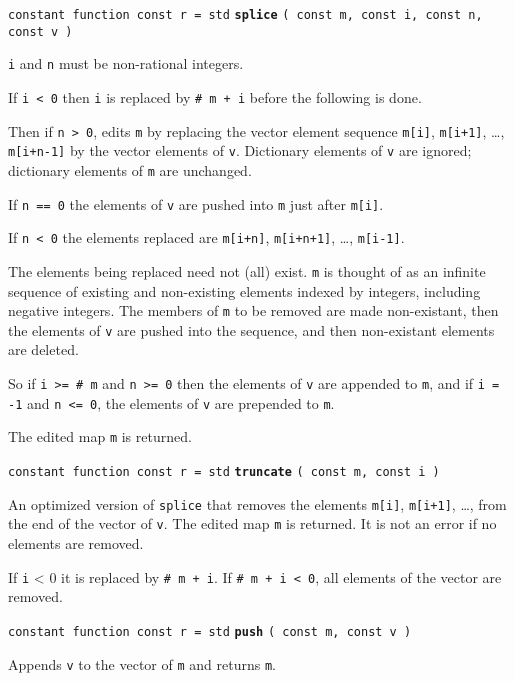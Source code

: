 \documentclass[12pt]{article}
\newcommand{\ttkey}[1]{{\tt \bfseries #1}}
\newenvironment{indpar}[1][0.3in]%
	{\begin{list}{}%
		     {\setlength{\itemsep}{0in}%
		      \setlength{\topsep}{0in}%
		      \setlength{\parsep}{1ex}%
		      \setlength{\labelwidth}{#1}%
		      \setlength{\leftmargin}{#1}%
		      \addtolength{\leftmargin}{\labelsep}}%
	 \item}%
	{\end{list}}
\begin{document}
{\tt constant function const r = std} \ttkey{splice}
    {\tt ( const m, const i, const n, const v )}
\begin{indpar}
{\tt i} and {\tt n} must be non-rational integers.

If {\tt i < 0} then {\tt i} is replaced by {\tt \# m + i} before the
following is done.

Then if {\tt n > 0},
edits {\tt m} by replacing the vector element sequence
{\tt m[i]}, {\tt m[i+1]}, \ldots, {\tt m[i+n-1]} by the
vector elements of {\tt v}.  Dictionary elements of {\tt v} are ignored;
dictionary elements of {\tt m} are unchanged.

If {\tt n == 0}
the elements of {\tt v} are pushed into {\tt m}
just after {\tt m[i]}.

If {\tt n < 0} the elements replaced are 
{\tt m[i+n]}, {\tt m[i+n+1]}, \ldots, {\tt m[i-1]}.

The elements being replaced need not (all) exist.  {\tt m} is thought
of as an infinite sequence of existing and non-existing elements indexed
by integers, including negative integers.  The members of
{\tt m} to be removed are made non-existant,
then the elements of {\tt v} are pushed
into the sequence, and then non-existant elements are deleted.

So if {\tt i >= \# m} and {\tt n >= 0} then the elements of {\tt v}
are appended to {\tt m}, and if {\tt i = -1} and {\tt n <= 0}, the
elements of {\tt v} are prepended to {\tt m}.

The edited map {\tt m} is returned.

\end{indpar}

{\tt constant function const r = std} \ttkey{truncate}
                                      {\tt ( const m, const i )}
\begin{indpar}
An optimized version of {\tt splice} that removes the elements
{\tt m[i]}, {\tt m[i+1]}, \ldots, from the end of the vector of {\tt v}.
The edited map {\tt m} is returned.  It is not an error if no elements
are removed.

If {\tt i} < 0 it is replaced by {\tt \# m + i}.  If {\tt \# m + i < 0},
all elements of the vector are removed.
\end{indpar}

{\tt constant function const r = std} \ttkey{push} {\tt ( const m, const v )}
\begin{indpar}
Appends {\tt v} to the vector of {\tt m} and returns {\tt m}.
\end{indpar}
\end{document}
